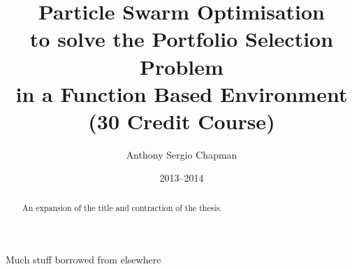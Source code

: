 \documentclass[bsc]{abdnthesis}
\title{Particle Swarm Optimisation \\ to solve the Portfolio Selection Problem \\ in a Function Based Environment \\ (30 Credit Course)}
\author{Anthony Sergio Chapman}
\date{2013--2014}
\begin{document}

\maketitle
\makedeclaration


\begin{abstract}
  An expansion of the title and contraction of the thesis.
\end{abstract}

\begin{acknowledgements}
  Much stuff borrowed from elsewhere
\end{acknowledgements}


\tableofcontents
\listoftables
\listoffigures
















\appendix


\end{document}
